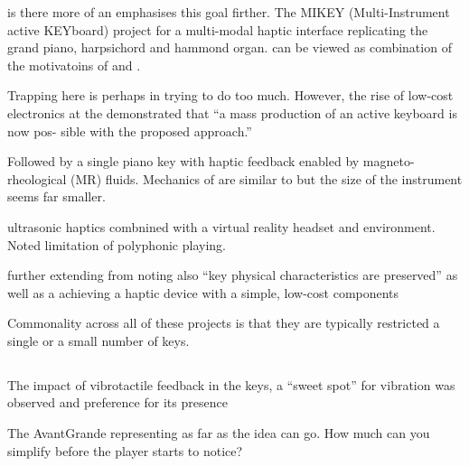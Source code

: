 \textcite{oboe_mikey_2006} is there more of an emphasises this goal firther. The MIKEY (Multi-Instrument active KEYboard) project for a multi-modal haptic interface replicating the grand piano, harpsichord and hammond organ. \textcite{oboe_mikey_2006} can be viewed as combination of the motivatoins of \textcite{cadoz_modular_1990} and \textcite{gillespie_virtual_1994}.

Trapping here is perhaps in trying to do too much. However, the rise of low-cost electronics at the demonstrated that ``a mass production of an active keyboard is now pos- sible with the proposed approach.''

Followed by \textcite{lozada_novel_2007} a single piano key with haptic feedback enabled by magneto-rheological (MR) fluids. Mechanics of \textcite{lozada_novel_2007} are similar to \textcite{cadoz_modular_1990} but the size of the instrument seems far smaller.

\cite{hwang_airpiano_2017} ultrasonic haptics combnined with a virtual reality headset and environment. Noted limitation of polyphonic playing.

\cite{timmermans_multibody-based_2020} further extending from  \cite{oboe_mikey_2006}  noting also  ``key physical characteristics are preserved'' as well as a achieving a haptic device with a simple, low-cost components

Commonality across all of these projects is that they are typically restricted a single or a small number of keys.


\subsection{\cite{fluckiger_evaluation_2018,fluckiger_influence_2018}}

The impact of vibrotactile feedback in the keys, a ``sweet spot'' for vibration was observed and preference for its presence

The AvantGrande representing as far as the idea can go. How much can you simplify before the player starts to notice?



\subsection{\cite{mcalpine_sampling_2014}}

